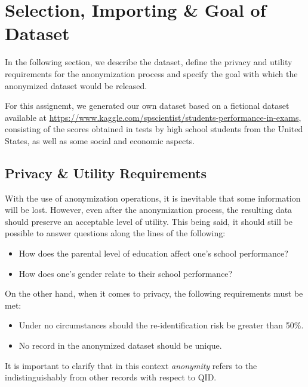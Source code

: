 \documentclass[a4paper, 11pt]{article}
\begin{document}
\pagebreak

\section{Selection, Importing \& Goal of Dataset} \label{sec:import}

In the following section, we describe the dataset, define the privacy and 
utility requirements for the anonymization process and specify the goal with 
which the anonymized dataset would be released.

For this assignemt, we generated our own dataset based on a fictional dataset 
available at 
\url{https://www.kaggle.com/spscientist/students-performance-in-exams}, 
consisting of the scores obtained in tests by high school students from the 
United States, as well as some social and economic aspects.

\subsection{Privacy \& Utility Requirements} \label{sec:requirements}

With the use of anonymization operations, it is inevitable that some 
information will be lost. However, even after the anonymization process, the 
resulting data should preserve an acceptable level of utility. This being said, 
it should still be possible to answer questions along the lines of the 
following:

\begin{itemize}
    \item How does the parental level of education affect one's school 
    performance?
    \item How does one's gender relate to their school performance?
\end{itemize}

On the other hand, when it comes to privacy, the following requirements must be 
met:

\begin{itemize}
    \item Under no circumstances should the re-identification risk be greater 
    than 50\%.
    \item No record in the anonymized dataset should be unique.
\end{itemize}

It is important to clarify that in this context \textit{anonymity} refers to 
the indistinguishably from other records with respect to QID.
\end{document}
